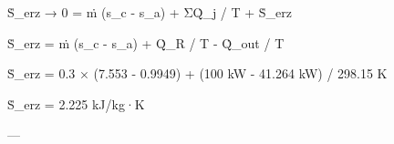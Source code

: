 Ṡ_erz → 0 = ṁ (s_c - s_a) + ΣQ̇_j / T + Ṡ_erz  

Ṡ_erz = ṁ (s_c - s_a) + Q̇_R / T - Q̇_out / T  

Ṡ_erz = 0.3 × (7.553 - 0.9949) + (100 kW - 41.264 kW) / 298.15 K  

Ṡ_erz = 2.225 kJ/kg·K  

---